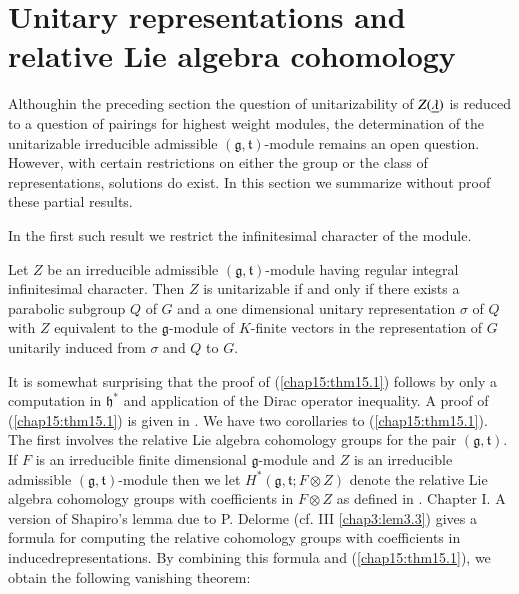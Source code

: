 
\chapter[Unitary representations and relative...]{Unitary
  representations and relative Lie algebra cohomology}\label{sec15} 

Although\pageoriginale in the preceding section the question of
unitarizability of $Z(\underline{\lambda})$ is reduced to a question of
pairings for highest weight modules, the determination of the
unitarizable irreducible admissible $(\mathfrak{g},
\mathfrak{t})$-module remains an open question. However, with certain
restrictions on either the group or the class of representations,
solutions do exist. In this section we summarize without proof these
partial results. 

In the first such result we restrict the infinitesimal character of
the module. 

\begin{theorem}\label{chap15:thm15.1}
Let $Z$ be an irreducible admissible
$(\mathfrak{g},\mathfrak{t})$-module having regular integral
infinitesimal character. Then $Z$ is unitarizable if and only if there
exists a parabolic subgroup $Q$ of $G$ and a one dimensional unitary
representation $\sigma$ of $Q$ with $Z$ equivalent to the
$\mathfrak{g}$-module of $K$-finite vectors in the representation of
$G$ unitarily induced from $\sigma$ and $Q$ to $G$. 
\end{theorem}

It is somewhat surprising that the proof of (\ref{chap15:thm15.1})
follows by only a 
computation in $\mathfrak{h}^*$ and application of the Dirac operator
inequality. A proof of (\ref{chap15:thm15.1}) is given in
\cite{key18}. We have two 
corollaries to (\ref{chap15:thm15.1}). The first involves the relative
Lie algebra 
cohomology groups  for the pair $(\mathfrak{g}, \mathfrak{t})$. If $F$
is an irreducible finite dimensional $\mathfrak{g}$-module and $Z$ is
an irreducible admissible $(\mathfrak{g}, \mathfrak{t})$-module then
we let $H^*(\mathfrak{g}, \mathfrak{t}; F \otimes Z)$ denote the
relative Lie algebra cohomology groups with coefficients in $F \otimes
Z$ as defined in \cite{key4}. Chapter I. A version of Shapiro's lemma
due to P. Delorme (cf. \cite{key4} III \ref{chap3:lem3.3}) gives a formula for
computing the relative cohomology groups with coefficients in
induced\pageoriginale representations. By combining this formula and
(\ref{chap15:thm15.1}), we obtain the following vanishing theorem:

